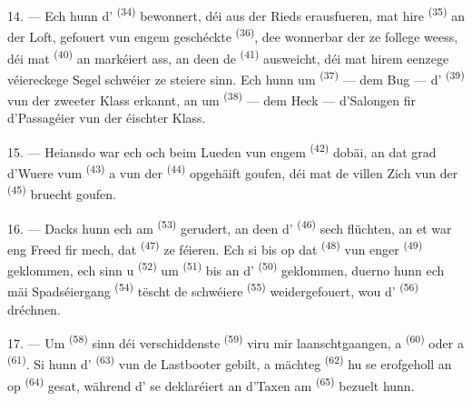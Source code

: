 \VUsaut{4.0mm}
\VUsaut{3.0mm}

14. --- Ech hunn d' \textsuperscript{(34)} bewonnert, déi aus
der Rieds erausfueren, mat hire  \textsuperscript{(35)} an der
Loft, gefouert vun engem geschéckte  \textsuperscript{(36)}, dee
wonnerbar der  ze follege weess, déi mat 
\textsuperscript{(40)} an  markéiert ass, an deen de
 \textsuperscript{(41)} ausweicht, déi mat hirem eenzege
véiereckege Segel schwéier ze steiere sinn. Ech hunn um 
\textsuperscript{(37)} --- dem Bug --- d' \textsuperscript{(39)} vun
der zweeter Klass erkannt, an um  \textsuperscript{(38)} ---
dem Heck --- d'Salongen fir d'Passagéier vun der éischter Klass.

15. --- Heiansdo war ech och beim Lueden vun engem 
\textsuperscript{(42)} dobäi, an dat grad d'Wuere vum 
\textsuperscript{(43)} a vun der  \textsuperscript{(44)}
opgehäift goufen, déi mat de villen Zich vun der 
\textsuperscript{(45)} bruecht goufen.

\VUsaut{3.0mm}
\VUsaut{3.0mm}

16. --- Dacks hunn ech am  \textsuperscript{(53)} gerudert, an
deen d' \textsuperscript{(46)} sech flüchten, an et war eng Freed fir
mech, dat  \textsuperscript{(47)} ze féieren. Ech si bis op dat
 \textsuperscript{(48)} vun enger 
\textsuperscript{(49)} geklommen, ech sinn u  \textsuperscript{(52)}
um  \textsuperscript{(51)} bis an d'
\textsuperscript{(50)} geklommen, duerno hunn ech mäi Spadséiergang  \textsuperscript{(54)} tëscht de schwéiere 
\textsuperscript{(55)} weidergefouert, wou d' \textsuperscript{(56)}
dréchnen.

17. --- Um  \textsuperscript{(58)} sinn déi verschiddenste
 \textsuperscript{(59)} viru mir laanschtgaangen, a 
\textsuperscript{(60)} oder a  \textsuperscript{(61)}. Si hunn
d' \textsuperscript{(63)} vun de Lastbooter gebilt, a mächteg
 \textsuperscript{(62)} hu se erofgeholl an op 
\textsuperscript{(64)} gesat, während d' se deklaréiert an
d'Taxen am  \textsuperscript{(65)} bezuelt hunn.


